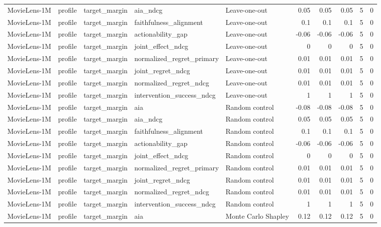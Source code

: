 \begin{table}[t]
{\begin{tabular}{lllllrrrrr}
MovieLens-1M & profile & target\_margin & aia\_ndcg & Leave-one-out & 0.05 & 0.05 & 0.05 & 5 & 0 \\
MovieLens-1M & profile & target\_margin & faithfulness\_alignment & Leave-one-out & 0.1 & 0.1 & 0.1 & 5 & 0 \\
MovieLens-1M & profile & target\_margin & actionability\_gap & Leave-one-out & -0.06 & -0.06 & -0.06 & 5 & 0 \\
MovieLens-1M & profile & target\_margin & joint\_effect\_ndcg & Leave-one-out & 0 & 0 & 0 & 5 & 0 \\
MovieLens-1M & profile & target\_margin & normalized\_regret\_primary & Leave-one-out & 0.01 & 0.01 & 0.01 & 5 & 0 \\
MovieLens-1M & profile & target\_margin & joint\_regret\_ndcg & Leave-one-out & 0.01 & 0.01 & 0.01 & 5 & 0 \\
MovieLens-1M & profile & target\_margin & normalized\_regret\_ndcg & Leave-one-out & 0.01 & 0.01 & 0.01 & 5 & 0 \\
MovieLens-1M & profile & target\_margin & intervention\_success\_ndcg & Leave-one-out & 1 & 1 & 1 & 5 & 0 \\
MovieLens-1M & profile & target\_margin & aia & Random control & -0.08 & -0.08 & -0.08 & 5 & 0 \\
MovieLens-1M & profile & target\_margin & aia\_ndcg & Random control & 0.05 & 0.05 & 0.05 & 5 & 0 \\
MovieLens-1M & profile & target\_margin & faithfulness\_alignment & Random control & 0.1 & 0.1 & 0.1 & 5 & 0 \\
MovieLens-1M & profile & target\_margin & actionability\_gap & Random control & -0.06 & -0.06 & -0.06 & 5 & 0 \\
MovieLens-1M & profile & target\_margin & joint\_effect\_ndcg & Random control & 0 & 0 & 0 & 5 & 0 \\
MovieLens-1M & profile & target\_margin & normalized\_regret\_primary & Random control & 0.01 & 0.01 & 0.01 & 5 & 0 \\
MovieLens-1M & profile & target\_margin & joint\_regret\_ndcg & Random control & 0.01 & 0.01 & 0.01 & 5 & 0 \\
MovieLens-1M & profile & target\_margin & normalized\_regret\_ndcg & Random control & 0.01 & 0.01 & 0.01 & 5 & 0 \\
MovieLens-1M & profile & target\_margin & intervention\_success\_ndcg & Random control & 1 & 1 & 1 & 5 & 0 \\
MovieLens-1M & profile & target\_margin & aia & Monte Carlo Shapley & 0.12 & 0.12 & 0.12 & 5 & 0 \\

\end{tabular}}
\end{table}
